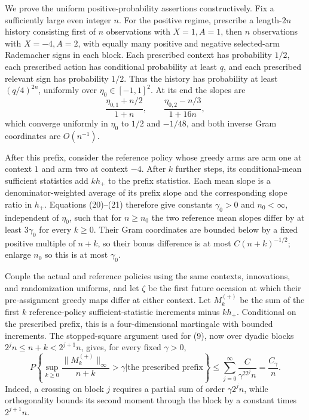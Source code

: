 We prove the uniform positive-probability assertions constructively. Fix a sufficiently large even integer \(n\). For the positive regime, prescribe a length-\(2n\) history consisting first of \(n\) observations with \(X=1,A=1\), then \(n\) observations with \(X=-4,A=2\), with equally many positive and negative selected-arm Rademacher signs in each block. Each prescribed context has probability \(1/2\), each prescribed action has conditional probability at least \(q\), and each prescribed relevant sign has probability \(1/2\). Thus the history has probability at least \((q/4)^{2n}\), uniformly over \(\eta_0\in[-1,1]^2\). At its end the slopes are
\[
 \frac{\eta_{0,1}+n/2}{1+n},
 \qquad
 \frac{\eta_{0,2}-n/3}{1+16n}, \tag{21}
\]
which converge uniformly in \(\eta_0\) to \(1/2\) and \(-1/48\), and both inverse Gram coordinates are \(O(n^{-1})\).

After this prefix, consider the reference policy whose greedy arms are arm one at context \(1\) and arm two at context \(-4\). After \(k\) further steps, its conditional-mean sufficient statistics add \(kh_+\) to the prefix statistics. Each mean slope is a denominator-weighted average of its prefix slope and the corresponding slope ratio in \(h_+\). Equations (20)--(21) therefore give constants \(\gamma_0>0\) and \(n_0<\infty\), independent of \(\eta_0\), such that for \(n\ge n_0\) the two reference mean slopes differ by at least \(3\gamma_0\) for every \(k\ge0\). Their Gram coordinates are bounded below by a fixed positive multiple of \(n+k\), so their bonus difference is at most \(C(n+k)^{-1/2}\); enlarge \(n_0\) so this is at most \(\gamma_0\).

Couple the actual and reference policies using the same contexts, innovations, and randomization uniforms, and let \(\zeta\) be the first future occasion at which their pre-assignment greedy maps differ at either context. Let \(M_k^{(+)}\) be the sum of the first \(k\) reference-policy sufficient-statistic increments minus \(kh_+\). Conditional on the prescribed prefix, this is a four-dimensional martingale with bounded increments. The stopped-square argument used for (9), now over dyadic blocks \(2^jn\le n+k<2^{j+1}n\), gives, for every fixed \(\gamma>0\),
\[
 P\left\{\sup_{k\ge0}\frac{\|M_k^{(+)}\|_\infty}{n+k}>\gamma
 \mathrel{\Big|}\text{the prescribed prefix}\right\}
 \le\sum_{j=0}^{\infty}\frac{C}{\gamma^22^jn}
 =\frac{C_\gamma}{n}. \tag{22}
\]
Indeed, a crossing on block \(j\) requires a partial sum of order \(\gamma2^jn\), while orthogonality bounds its second moment through the block by a constant times \(2^{j+1}n\).

